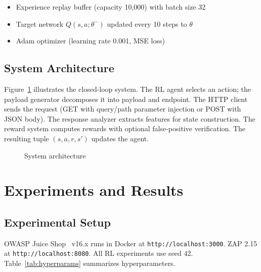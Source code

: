 \documentclass[5p,twocolumn]{elsarticle}
\begin{document}
\begin{itemize}
    \item Experience replay buffer (capacity 10,000) with batch size 32
    \item Target network $Q(s,a;\theta^-)$ updated every 10 steps to $\theta$
    \item Adam optimizer (learning rate 0.001, MSE loss)
\end{itemize}

\subsection{System Architecture}

Figure~\ref{fig:architecture} illustrates the closed-loop system. The RL agent selects an action; the payload generator decomposes it into payload and endpoint. The HTTP client sends the request (GET with query/path parameter injection or POST with JSON body). The response analyzer extracts features for state construction. The reward system computes rewards with optional false-positive verification. The resulting tuple $(s,a,r,s')$ updates the agent.

\begin{figure}[t]
\centering
{}
\caption{System architecture}
\label{fig:architecture}
\end{figure}

\section{Experiments and Results}
\label{sec:experiments}

\subsection{Experimental Setup}

OWASP Juice Shop~\cite{juiceshop} v16.x runs in Docker at \texttt{http://localhost:3000}. ZAP 2.15 at \texttt{http://localhost:8080}. All RL experiments use seed 42. Table~\ref{tab:hyperparams} summarizes hyperparameters.
\end{document}
